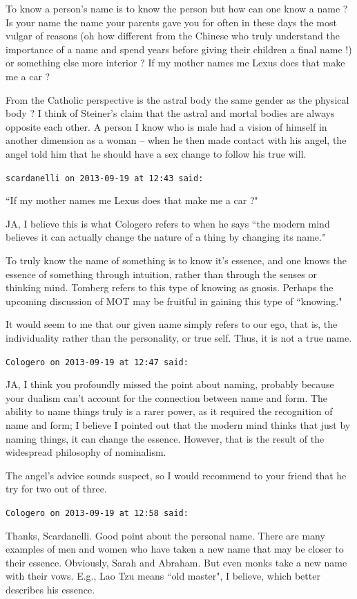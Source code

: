 \begin{footnotesize}
\begin{sffamily}
To know a person's name is to know the person but how can one know a name ? Is your name the name your parents gave you for often in these days the most vulgar of reasons (oh how different from the Chinese who truly understand the importance of a name and spend years before giving their children a final name !) or something else more interior ? If my mother names me Lexus does that make me a car ?

From the Catholic perspective is the astral body the same gender as the physical body ? I think of Steiner's claim that the astral and mortal bodies are always opposite each other. A person I know who is male had a vision of himself in another dimension as a woman – when he then made contact with his angel, the angel told him that he should have a sex change to follow his true will.


\hfill

\texttt{scardanelli on 2013-09-19 at 12:43 said: }

``If my mother names me Lexus does that make me a car ?"

JA, I believe this is what Cologero refers to when he says ``the modern mind believes it can actually change the nature of a thing by changing its name." 

To truly know the name of something is to know it's essence, and one knows the essence of something through intuition, rather than through the senses or thinking mind. Tomberg refers to this type of knowing as gnosis. Perhaps the upcoming discussion of MOT may be fruitful in gaining this type of ``knowing."

It would seem to me that our given name simply refers to our ego, that is, the individuality rather than the personality, or true self. Thus, it is not a true name.


\hfill

\texttt{Cologero on 2013-09-19 at 12:47 said: }

JA, I think you profoundly missed the point about naming, probably because your dualism can't account for the connection between name and form. The ability to name things truly is a rarer power, as it required the recognition of name and form; I believe I pointed out that the modern mind thinks that just by naming things, it can change the essence. However, that is the result of the widespread philosophy of nominalism.

The angel's advice sounds suspect, so I would recommend to your friend that he try for two out of three.


\hfill

\texttt{Cologero on 2013-09-19 at 12:58 said: }

Thanks, Scardanelli. Good point about the personal name. There are many examples of men and women who have taken a new name that may be closer to their essence. Obviously, Sarah and Abraham. But even monks take a new name with their vows. E.g., Lao Tzu means ``old master", I believe, which better describes his essence.


\end{sffamily}\end{footnotesize}
